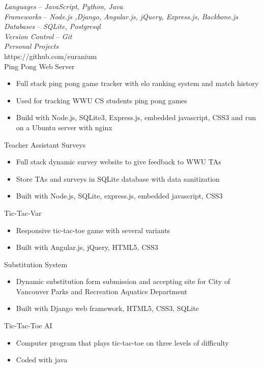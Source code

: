\documentclass[line,margin]{res}
\begin{document}
\begin{resume}
	{\sl Languages} -- {\sl JavaScript, Python, Java}\\
	{\sl Frameworks} -- {\sl Node.js ,Django, Angular.js, jQuery, Express.js, Backbone.js} \\
	{\sl Databases} -- {\sl SQLite, Postgresql} \\
	{\sl Version Control} -- {\sl Git}\\
	{\sl Personal Projects}\\
	{\footnotesize https://github.com/euranium}\\
	Ping Pong Web Server
	\begin{itemize} \itemsep -2pt
		\item Full stack ping pong game tracker with elo ranking system and match history
		\item Used for tracking WWU CS students ping pong games
		\item Build with Node.js, SQLite3, Express.js, embedded javascript, CSS3 and run on a Ubuntu server with nginx
	\end{itemize}
	Teacher Assistant Surveys
	\begin{itemize} \itemsep -2pt
		\item Full stack dynamic survey website to give feedback to WWU TAs
		\item Store TAs and surveys in SQLite database with data sanitization
		\item Built with Node.js, SQLite, express.js, embedded javascript, CSS3
	\end{itemize}
	Tic-Tac-Var
	\begin{itemize} \itemsep -2pt
		\item Responsive tic-tac-toe game with several variants
		\item Built with Angular.js, jQuery, HTML5, CSS3
	\end{itemize}
	Substitution System
	\begin{itemize} \itemsep -2pt
		\item Dynamic substitution form submission and accepting site for City of Vancouver Parks and Recreation Aquatics Department
		\item Built with Django web framework, HTML5, CSS3, SQLite
	\end{itemize}
	Tic-Tac-Toe AI
	\begin{itemize} \itemsep -2pt
		\item Computer program that plays tic-tac-toe on three levels of difficulty
		\item Coded with java
	\end{itemize}


\end{resume}
\end{document}
